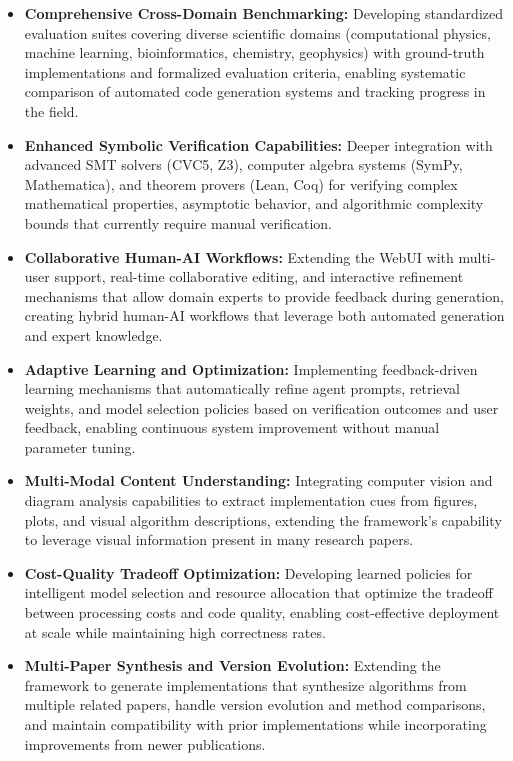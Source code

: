 \documentclass{ieeeaccess}
\begin{document}
\begin{itemize}
\item \textbf{Comprehensive Cross-Domain Benchmarking:} Developing standardized evaluation suites covering diverse scientific domains (computational physics, machine learning, bioinformatics, chemistry, geophysics) with ground-truth implementations and formalized evaluation criteria, enabling systematic comparison of automated code generation systems and tracking progress in the field.

\item \textbf{Enhanced Symbolic Verification Capabilities:} Deeper integration with advanced SMT solvers (CVC5, Z3), computer algebra systems (SymPy, Mathematica), and theorem provers (Lean, Coq) for verifying complex mathematical properties, asymptotic behavior, and algorithmic complexity bounds that currently require manual verification.

\item \textbf{Collaborative Human-AI Workflows:} Extending the WebUI with multi-user support, real-time collaborative editing, and interactive refinement mechanisms that allow domain experts to provide feedback during generation, creating hybrid human-AI workflows that leverage both automated generation and expert knowledge.

\item \textbf{Adaptive Learning and Optimization:} Implementing feedback-driven learning mechanisms that automatically refine agent prompts, retrieval weights, and model selection policies based on verification outcomes and user feedback, enabling continuous system improvement without manual parameter tuning.

\item \textbf{Multi-Modal Content Understanding:} Integrating computer vision and diagram analysis capabilities to extract implementation cues from figures, plots, and visual algorithm descriptions, extending the framework's capability to leverage visual information present in many research papers.

\item \textbf{Cost-Quality Tradeoff Optimization:} Developing learned policies for intelligent model selection and resource allocation that optimize the tradeoff between processing costs and code quality, enabling cost-effective deployment at scale while maintaining high correctness rates.

\item \textbf{Multi-Paper Synthesis and Version Evolution:} Extending the framework to generate implementations that synthesize algorithms from multiple related papers, handle version evolution and method comparisons, and maintain compatibility with prior implementations while incorporating improvements from newer publications.
\end{itemize}
\end{document}
